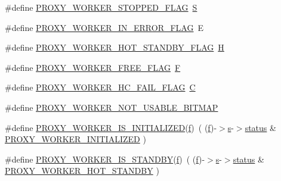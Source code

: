 \begin{DoxyCompactItemize}
\item 
\#define \hyperlink{group__MOD__PROXY_ga5cbd3845247e45f675dda7d3e131fc00}{P\+R\+O\+X\+Y\+\_\+\+W\+O\+R\+K\+E\+R\+\_\+\+S\+T\+O\+P\+P\+E\+D\+\_\+\+F\+L\+AG}~\textquotesingle{}\hyperlink{sljitNativePPC__common_8c_a8fa17c8cf4c36df48f4108c36da8573e}{S}\textquotesingle{}
\item 
\#define \hyperlink{group__MOD__PROXY_gaecebbb9bf3b0711c86c5136557b8fc46}{P\+R\+O\+X\+Y\+\_\+\+W\+O\+R\+K\+E\+R\+\_\+\+I\+N\+\_\+\+E\+R\+R\+O\+R\+\_\+\+F\+L\+AG}~\textquotesingle{}E\textquotesingle{}
\item 
\#define \hyperlink{group__MOD__PROXY_gab06b081d2bd92e0f1f926d6fcaf5e1f0}{P\+R\+O\+X\+Y\+\_\+\+W\+O\+R\+K\+E\+R\+\_\+\+H\+O\+T\+\_\+\+S\+T\+A\+N\+D\+B\+Y\+\_\+\+F\+L\+AG}~\textquotesingle{}\hyperlink{pcregrep_8txt_a628ab430cad0d4a0741ded1e4fcbd2b9}{H}\textquotesingle{}
\item 
\#define \hyperlink{group__MOD__PROXY_gaf09a340fdf12d2c3ab64d9014199d470}{P\+R\+O\+X\+Y\+\_\+\+W\+O\+R\+K\+E\+R\+\_\+\+F\+R\+E\+E\+\_\+\+F\+L\+AG}~\textquotesingle{}\hyperlink{pcregrep_8txt_a013fd4b4f95b6325776c217d4df1fd5e}{F}\textquotesingle{}
\item 
\#define \hyperlink{group__MOD__PROXY_gacd656bff19d224f3d2831c9ff7435e19}{P\+R\+O\+X\+Y\+\_\+\+W\+O\+R\+K\+E\+R\+\_\+\+H\+C\+\_\+\+F\+A\+I\+L\+\_\+\+F\+L\+AG}~\textquotesingle{}\hyperlink{NON-AUTOTOOLS-BUILD_8txt_ac5c2ebe543528426f0c731e1b7056868}{C}\textquotesingle{}
\item 
\#define \hyperlink{group__MOD__PROXY_gae7a5630b6dbe53da5a1b62e12aa51e37}{P\+R\+O\+X\+Y\+\_\+\+W\+O\+R\+K\+E\+R\+\_\+\+N\+O\+T\+\_\+\+U\+S\+A\+B\+L\+E\+\_\+\+B\+I\+T\+M\+AP}
\item 
\#define \hyperlink{group__MOD__PROXY_gad848af9f29810626eef24a4229683293}{P\+R\+O\+X\+Y\+\_\+\+W\+O\+R\+K\+E\+R\+\_\+\+I\+S\+\_\+\+I\+N\+I\+T\+I\+A\+L\+I\+Z\+ED}(\hyperlink{pcregrep_8txt_a588c778c1c1509e472f22dc36efb005e}{f})~( (\hyperlink{pcregrep_8txt_a588c778c1c1509e472f22dc36efb005e}{f})-\/$>$\hyperlink{pcretest_8txt_a062597889ba244b72877454b1d3adecf}{s}-\/$>$\hyperlink{group__apr__thread__proc_gae7daf19056dc6ab36e8f2e72e911646d}{status} \&  \hyperlink{group__MOD__PROXY_ga55f1fe4d773fda3175784b955d58376b}{P\+R\+O\+X\+Y\+\_\+\+W\+O\+R\+K\+E\+R\+\_\+\+I\+N\+I\+T\+I\+A\+L\+I\+Z\+ED} )
\item 
\#define \hyperlink{group__MOD__PROXY_gaf3f39f5c5218183220e5770b600de778}{P\+R\+O\+X\+Y\+\_\+\+W\+O\+R\+K\+E\+R\+\_\+\+I\+S\+\_\+\+S\+T\+A\+N\+D\+BY}(\hyperlink{pcregrep_8txt_a588c778c1c1509e472f22dc36efb005e}{f})~( (\hyperlink{pcregrep_8txt_a588c778c1c1509e472f22dc36efb005e}{f})-\/$>$\hyperlink{pcretest_8txt_a062597889ba244b72877454b1d3adecf}{s}-\/$>$\hyperlink{group__apr__thread__proc_gae7daf19056dc6ab36e8f2e72e911646d}{status} \&  \hyperlink{group__MOD__PROXY_ga6a3f52e33bd6370033907db181d9580a}{P\+R\+O\+X\+Y\+\_\+\+W\+O\+R\+K\+E\+R\+\_\+\+H\+O\+T\+\_\+\+S\+T\+A\+N\+D\+BY} )

\end{DoxyCompactItemize}
